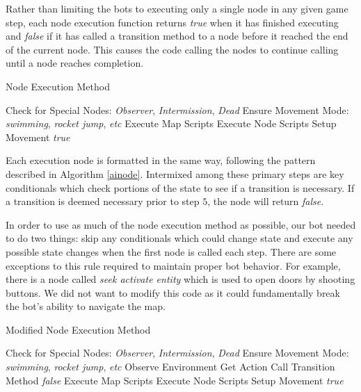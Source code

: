Rather than limiting the bots to executing only a single node in any given game step, each node execution function returns \emph{true} when it has finished executing and \emph{false} if it has called a transition method to a node before it reached the end of the current node. This causes the code calling the nodes to continue calling until a node reaches completion.

\begin{algorithm}
\caption{Node Execution Method}
\label{ainode}
    {\fontsize{12}{10}\selectfont
    \begin{algorithmic}[1]
        \STATE Check for Special Nodes: \emph{Observer}, \emph{Intermission}, \emph{Dead}
        \STATE Ensure Movement Mode: \emph{swimming}, \emph{rocket jump}, \emph{etc}
        \STATE Execute Map Scripts
        \STATE Execute Node Scripts
        \STATE Setup Movement
        \RETURN \emph{true}
    \end{algorithmic}
    }
\end{algorithm}

Each execution node is formatted in the same way, following the pattern described in Algorithm \ref{ainode}. Intermixed among these primary steps are key conditionals which check portions of the state to see if a transition is necessary. If a transition is deemed necessary prior to step $5$, the node will return \emph{false}.

In order to use as much of the node execution method as possible, our bot needed to do two things: skip any conditionals which could change state and execute any possible state changes when the first node is called each step. There are some exceptions to this rule required to maintain proper bot behavior. For example, there is a node called \emph{seek activate entity} which is used to open doors by shooting buttons. We did not want to modify this code as it could fundamentally break the bot's ability to navigate the map.

\begin{algorithm}
\caption{Modified Node Execution Method}
\label{ainode:custom}
    {\fontsize{12}{10}\selectfont
    \begin{algorithmic}[1]
        \STATE Check for Special Nodes: \emph{Observer}, \emph{Intermission}, \emph{Dead}
        \STATE Ensure Movement Mode: \emph{swimming}, \emph{rocket jump}, \emph{etc}
            \STATE Observe Environment
            \STATE Get Action
                \STATE Call Transition Method
                \RETURN \emph{false}
            \ENDIF
        \ENDIF
        \STATE Execute Map Scripts
        \STATE Execute Node Scripts
        \STATE Setup Movement
        \RETURN \emph{true}
    \end{algorithmic}
    }
\end{algorithm}

